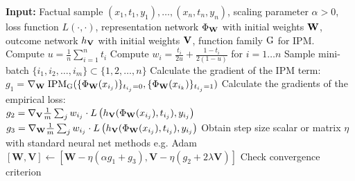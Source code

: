 \begin{algorithm}[tbp]
\caption{CFR: Counterfactual regression with integral probability metrics}
\label{alg:model}
\begin{algorithmic}[1]
  \STATE \textbf{Input:} Factual sample $(x_1,t_1,y_1), \ldots , (x_n,t_n,y_n)$, scaling parameter $\alpha>0$, loss function $L\left(\cdot,\cdot\right)$, representation network $\Phi_{\bf{W}}$ with initial weights $\bf{W}$, outcome network $h_{\bf{V}}$ with initial weights $\bf{V}$, function family $\mathrm{G}$ for IPM.
\STATE Compute $u=\frac{1}{n}\sum_{i=1}^n t_i$
 \STATE Compute $w_i = \frac{t_i}{2u} + \frac{1-t_i}{2(1-u)}$ for $i=1\ldots n$
       \STATE Sample mini-batch  $\{i_1,i_2,\ldots, i_m\} \subset  \{1,2,\ldots, n\}$
    \STATE Calculate the gradient of the IPM term:\\
    $g_1 = ${\small $\nabla_{\bf{W}} \; \text{IPM}_{\mathrm{G}}(\{\Phi_{\bf{W}}(x_{i_j})\}_{t_{i_j} = 0}, \{\Phi_{\bf{W}}(x_{i_{k}})\}_{t_{i_j} = 1} )$}
    \STATE Calculate the gradients of the empirical loss: \\
    $g_2 = \nabla_{\bf{V}}\frac{1}{m} \sum_j w_{i_j} \cdot L\left(h_{\bf{V}}(\Phi_{\bf{W}}(x_{i_j}),t_{i_j}), y_{i_j}\right)$ \\
    $g_3 = \nabla_{\bf{W}}\frac{1}{m}\sum_j w_{i_j} \cdot L\left(h_{\bf{V}}(\Phi_{\bf{W}}(x_{i_j}),t_{i_j}), y_{i_j}\right)$
    \STATE Obtain step size scalar or matrix $\eta$ with standard neural net methods e.g. Adam~\citep{kingma2014adam}
    \STATE  $\left[\mathbf{W},\mathbf{V}\right] \leftarrow \left[\mathbf{W} - \eta(\alpha g_1 +  g_3 ),  \mathbf{V} - \eta(g_2 + 2 \lambda \mathbf{V}) \right]$
    \STATE Check convergence criterion
  \ENDWHILE
\end{algorithmic}
\end{algorithm}
